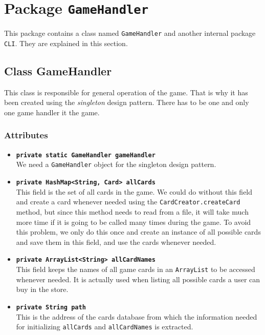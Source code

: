 \documentclass[a4paper]{article}
\begin{document}
\clearpage
\section{Package \texttt{GameHandler}}
This package contains a class named \texttt{GameHandler} and another internal package \texttt{CLI}. They are explained in this section.
\subsection{Class GameHandler}
This class is responsible for general operation of the game. That is why it has been created using the \textit{singleton} design pattern. There has to be one and only one game handler it the game.

\subsubsection{Attributes}
\begin{itemize}
	\item \texttt{\textbf{private static GameHandler gameHandler}}\\
	We need a \texttt{GameHandler} object for the singleton design pattern.
	
	\item \texttt{\textbf{private HashMap<String, Card> allCards}}\\
	This field is the set of all cards in the game. We could do without this field and create a card whenever needed using the \texttt{CardCreator.createCard} method, but since this method needs to read from a file, it will take much more time if it is going to be called many times during the game. To avoid this problem, we only do this once and create an instance of all possible cards and save them in this field, and use the cards whenever needed. 
	
	\item \texttt{\textbf{private ArrayList<String> allCardNames}}\\
	This field keeps the names of all game cards in an \texttt{ArrayList} to be accessed whenever needed. It is actually used when listing all possible cards a user can buy in the store.
	
	\item \texttt{\textbf{private String path}}\\
	This is the address of the cards database from which the information needed for initializing \texttt{allCards} and \texttt{allCardNames} is extracted.
\end{itemize}
\end{document}
